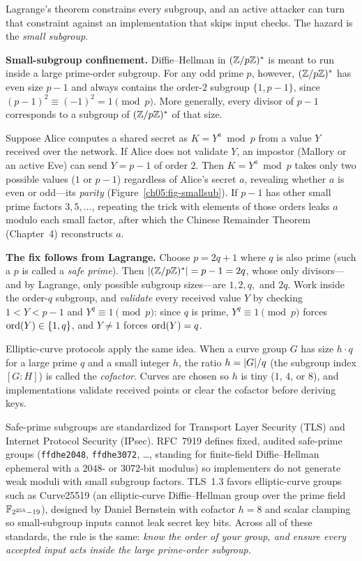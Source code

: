 Lagrange's theorem constrains every subgroup, and an active attacker can turn that constraint against an implementation that skips input checks. The hazard is the \emph{small subgroup}.

\begin{attackbox}
\textbf{Small-subgroup confinement.} Diffie--Hellman in $(\mathbb{Z}/p\mathbb{Z})^{*}$ is meant to run inside a
large prime-order subgroup. For any odd prime $p$, however, $(\mathbb{Z}/p\mathbb{Z})^{*}$ has even size $p-1$ and always contains the order-$2$ subgroup $\{1, p-1\}$, since
$(p-1)^2 \equiv (-1)^2 = 1 \pmod p$. More generally, every divisor of $p-1$ corresponds to a subgroup of $(\mathbb{Z}/p\mathbb{Z})^{*}$ of that size.

Suppose Alice computes a shared secret as $K = Y^a \bmod p$ from a value $Y$ received over the network. If Alice does not validate $Y$, an impostor (Mallory or an active Eve) can send $Y = p - 1$ of
order $2$. Then $K = Y^a \bmod p$ takes only two possible
values ($1$ or $p-1$) regardless of Alice's secret $a$, revealing whether $a$ is even or odd---its \emph{parity}
(Figure~\ref{ch05:fig-smallsub}).
If $p-1$ has other small prime factors $3, 5, \dots$, repeating the trick with elements of those orders leaks $a$ modulo each small
factor, after which the Chinese Remainder Theorem (Chapter~4) reconstructs $a$.

\textbf{The fix follows from Lagrange.} Choose $p = 2q+1$ where $q$ is also prime (such a $p$ is called a \emph{safe
prime}). Then $\lvert(\mathbb{Z}/p\mathbb{Z})^{*}\rvert = p - 1 = 2q$, whose only divisors---and by Lagrange, only possible subgroup sizes---are $1, 2, q,$ and $2q$. Work inside the order-$q$ subgroup, and \emph{validate} every received value $Y$ by checking $1 < Y < p-1$ and $Y^q \equiv 1 \pmod p$: since $q$ is prime, $Y^q \equiv 1 \pmod p$ forces $\operatorname{ord}(Y) \in \{1, q\}$, and $Y \ne 1$ forces $\operatorname{ord}(Y) = q$.

Elliptic-curve protocols apply the same idea. When a curve group $G$ has size $h \cdot q$ for a large prime $q$ and a small integer $h$, the ratio $h = \lvert G\rvert/q$ (the subgroup index $[G:H]$) is called the \emph{cofactor}. Curves are chosen so $h$ is tiny ($1$, $4$, or $8$), and implementations validate received points or clear the cofactor before deriving keys.
\end{attackbox}

\begin{applicationbox}
Safe-prime subgroups are standardized for Transport Layer Security (TLS) and Internet Protocol Security (IPsec). RFC~7919 defines
fixed, audited safe-prime groups (\texttt{ffdhe2048}, \texttt{ffdhe3072}, \dots, standing for finite-field Diffie--Hellman ephemeral with a $2048$- or $3072$-bit modulus) so
implementers do not generate weak moduli with small subgroup factors.
TLS~1.3 favors elliptic-curve groups such as Curve25519 (an elliptic-curve Diffie--Hellman group over the prime field $\mathbb{F}_{2^{255}-19}$), designed by
Daniel Bernstein with cofactor $h = 8$ and scalar clamping so small-subgroup inputs cannot leak secret key bits. Across all of these standards, the rule is the same: \emph{know the order of your group, and ensure every accepted input acts inside the large prime-order subgroup.}
\end{applicationbox}

